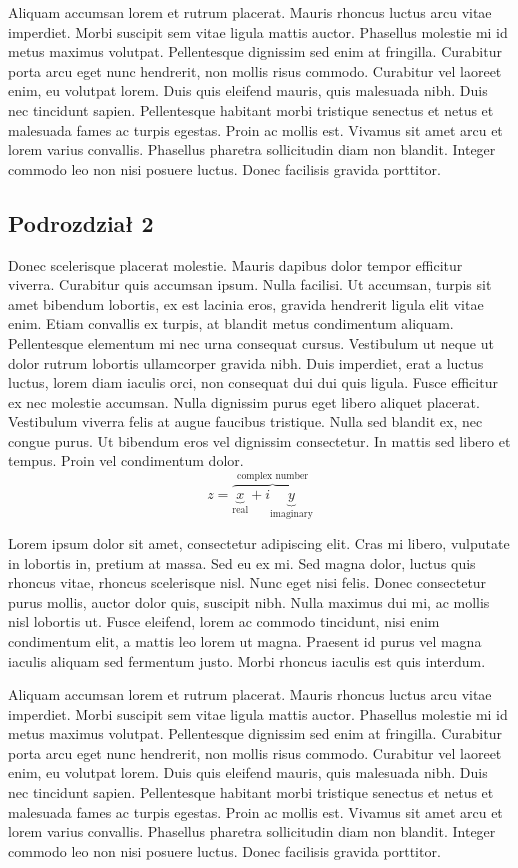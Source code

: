\documentclass[12pt,a4paper]{article}
\begin{document}
Aliquam accumsan lorem et rutrum placerat. Mauris rhoncus luctus arcu vitae imperdiet. Morbi suscipit sem vitae ligula mattis auctor. Phasellus molestie mi id metus maximus volutpat. Pellentesque dignissim sed enim at fringilla. Curabitur porta arcu eget nunc hendrerit, non mollis risus commodo. Curabitur vel laoreet enim, eu volutpat lorem. Duis quis eleifend mauris, quis malesuada nibh. Duis nec tincidunt sapien. Pellentesque habitant morbi tristique senectus et netus et malesuada fames ac turpis egestas. Proin ac mollis est. Vivamus sit amet arcu et lorem varius convallis. Phasellus pharetra sollicitudin diam non blandit. Integer commodo leo non nisi posuere luctus. Donec facilisis gravida porttitor.



	
	\subsection{Podrozdział 2}
	Donec scelerisque placerat molestie. Mauris dapibus dolor tempor efficitur viverra. Curabitur quis accumsan ipsum. Nulla facilisi. Ut accumsan, turpis sit amet bibendum lobortis, ex est lacinia eros, gravida hendrerit ligula elit vitae enim. Etiam convallis ex turpis, at blandit metus condimentum aliquam. Pellentesque elementum mi\cite{cztery} nec urna consequat cursus. Vestibulum ut neque ut dolor rutrum lobortis ullamcorper gravida nibh. Duis imperdiet, erat a luctus luctus, lorem diam iaculis orci, non consequat dui dui quis ligula. Fusce efficitur ex nec molestie accumsan. Nulla dignissim purus eget libero aliquet placerat. Vestibulum viverra felis at augue faucibus tristique. Nulla sed blandit ex, nec congue purus. Ut bibendum eros vel dignissim consectetur. In mattis sed libero et tempus. Proin vel condimentum dolor.
	\[
 z = \overbrace{
   \underbrace{x}_\text{real} + i
   \underbrace{y}_\text{imaginary}
  }^\text{complex number}
\] 
\label{wzor2}

Lorem ipsum dolor sit amet, consectetur adipiscing elit. Cras mi libero, vulputate in lobortis in, pretium at massa. Sed eu ex mi. Sed magna dolor, luctus quis rhoncus vitae, rhoncus scelerisque nisl. Nunc eget nisi felis. Donec consectetur purus mollis, auctor dolor quis, suscipit nibh. Nulla maximus dui mi, ac mollis nisl lobortis ut. Fusce eleifend, lorem ac commodo tincidunt, nisi enim condimentum elit, a mattis leo lorem ut magna. Praesent id purus vel magna iaculis aliquam sed fermentum justo. Morbi rhoncus iaculis est quis interdum.

Aliquam accumsan lorem et rutrum placerat. Mauris rhoncus luctus arcu vitae imperdiet. Morbi suscipit sem vitae ligula mattis auctor. Phasellus molestie mi id metus maximus volutpat. Pellentesque dignissim sed enim at fringilla. Curabitur porta arcu eget nunc hendrerit, non mollis risus commodo. Curabitur vel laoreet enim, eu volutpat lorem. Duis quis eleifend mauris, quis malesuada nibh. Duis nec tincidunt sapien. Pellentesque habitant morbi tristique senectus et netus et malesuada fames ac turpis egestas. Proin ac mollis est. Vivamus sit amet arcu et lorem varius convallis. Phasellus pharetra sollicitudin diam non blandit. Integer commodo leo non nisi posuere luctus. Donec facilisis gravida porttitor.
\end{document}
